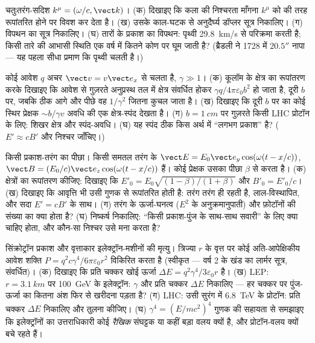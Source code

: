 \begin{exercise}[$\star\star$]\label{exo:b3:covariant-electromagnetism:8}
चतुःतरंग-सदिश $k^\mu = (\omega/c, \vect k)$। (क) दिखाइए कि
कला की निश्चरता माँगना $k^\mu$ को  की तरह रूपांतरित होने पर
विवश कर देता है। (ख) उसके काल-घटक से अनुदैर्घ्य डॉप्लर सूत्र
निकालिए। (ग) विपथन का सूत्र निकालिए। (घ) तारों के प्रकाश का
विपथन: पृथ्वी \qty{29.8}{km/s} से परिक्रमा करती है; किसी तारे की
आभासी स्थिति एक वर्ष में कितने कोण पर घूम जाती है? (ब्रैडली ने 1728 में
$20.5''$ नापा --- यह पहला सीधा प्रमाण कि पृथ्वी चलती है।)
\end{exercise}

\begin{exercise}[$\star\star$]\label{exo:b3:covariant-electromagnetism:9}
कोई आवेश $q$ अचर $\vect v = v\vect e_x$ से चलता है, $\gamma \gg
1$। (क) कूलॉम के क्षेत्र का रूपांतरण करके दिखाइए कि आवेश से गुज़रते
अनुप्रस्थ तल में क्षेत्र संवर्धित होकर $\gamma
q/4\pi\varepsilon_0b^2$ हो जाता है, दूरी $b$ पर, जबकि ठीक आगे और
पीछे वह $1/\gamma^2$ जितना कुचल जाता है। (ख) दिखाइए कि दूरी $b$ पर का
कोई स्थिर प्रेक्षक $\sim b/\gamma v$ अवधि की एक क्षेत्र-स्पंद देखता है। (ग) $b = \qty{1}{cm}$ पर गुज़रते किसी LHC प्रोटॉन के लिए:
शिखर क्षेत्र और स्पंद-अवधि। (घ) यह स्पंद ठीक किस अर्थ में ``लगभग
प्रकाश'' है? ($E' \approx cB'$ और निश्चर जाँचिए।)
\end{exercise}

\begin{exercise}[$\star\star\star$]\label{exo:b3:covariant-electromagnetism:10}
किसी प्रकाश-तरंग का पीछा। किसी समतल तरंग के $\vect E = E_0\vect e_y
\cos(\omega(t - x/c))$, $\vect B = (E_0/c)\vect e_z\cos(\omega(t -
x/c))$ हैं। कोई प्रेक्षक उसका पीछा $\beta$ से करता है। (क) क्षेत्रों
का रूपांतरण कीजिए: दिखाइए कि $E'_0 = E_0\sqrt{(1-\beta)/(1+\beta)}$ और $B'_0 = E'_0/c$। (ख)
दिखाइए कि आवृत्ति भी उसी गुणक से रूपांतरित होती है: तरंग तरंग ही रहती
है, लाल-विस्थापित, और सदा $E' = cB'$ के साथ। (ग) तरंग के ऊर्जा-घनत्व
($E^2$ के अनुक्रमानुपाती) और फ़ोटॉनों की संख्या का क्या होता है? (घ)
निष्कर्ष निकालिए: ``किसी प्रकाश-पुंज के साथ-साथ सवारी'' के लिए क्या
चाहिए होता, और कौन-सा निश्चर उसे मना करता है?
\end{exercise}

\begin{exercise}[$\star\star\star$]\label{exo:b3:covariant-electromagnetism:11}
सिंक्रोट्रॉन प्रकाश और वृत्ताकार इलेक्ट्रॉन-मशीनों की मृत्यु। त्रिज्या
$r$ के वृत्त पर कोई अति-आपेक्षिकीय आवेश शक्ति
$P = q^2c\gamma^4/6\pi\varepsilon_0r^2$ विकिरित करता है (स्वीकृत ---
वर्ष 2 के खंड का लार्मर सूत्र, संवर्धित)। (क) दिखाइए कि प्रति चक्कर
खोई ऊर्जा $\Delta E = q^2\gamma^4/3\varepsilon_0r$ है। (ख) LEP:
$r = \qty{3.1}{km}$ पर \qty{100}{GeV} के इलेक्ट्रॉन: $\gamma$ और
प्रति चक्कर $\Delta E$ निकालिए --- हर चक्कर पर पुंज-ऊर्जा का कितना
अंश फिर से खरीदना पड़ता है? (ग) LHC: उसी सुरंग में \qty{6.8}{TeV} के
प्रोटॉन: प्रति चक्कर $\Delta E$ निकालिए और तुलना कीजिए। (घ) $\gamma^4 =
(E/mc^2)^4$ गुणक की सहायता से समझाइए कि इलेक्ट्रॉनों का उत्तराधिकारी
कोई \emph{रैखिक} संघट्टक या कहीं बड़ा वलय क्यों है, और प्रोटॉन-वलय
क्यों बचे रहते हैं।
\end{exercise}

